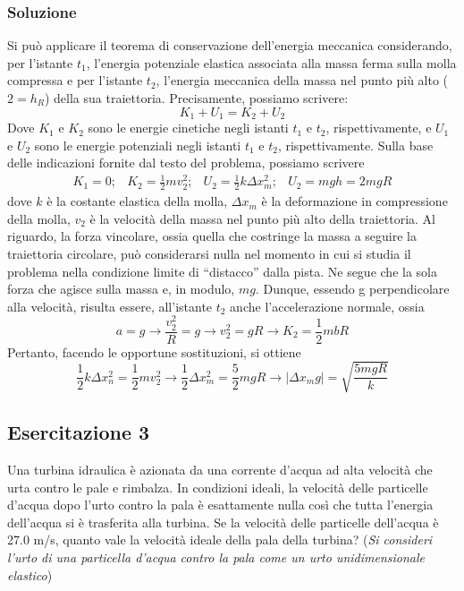 \subsubsection{Soluzione}
Si può applicare il teorema di conservazione dell’energia meccanica considerando, per l’istante $t_1$, l’energia potenziale elastica associata alla massa ferma sulla molla compressa e per l’istante  $t_2$, l’energia  meccanica  della  massa  nel  punto  più  alto  ($2=h_R$)  della  sua  traiettoria.  Precisamente, possiamo scrivere:
\begin{equation*}
	K_1+U_1=K_2+U_2
\end{equation*}
Dove  $K_1$  e  $K_2$  sono le energie cinetiche negli istanti  $t_1$  e  $t_2$, rispettivamente, e  $U_1$  e  $U_2$  sono le energie potenziali negli istanti $t_1$ e $t_2$, rispettivamente. Sulla base delle indicazioni fornite dal testo del problema, possiamo scrivere
\begin{equation*}
	\begin{matrix}
		K_1=0;&K_2=\frac{1}{2}mv_2^2;&U_2=\frac{1}{2}k\Delta x_m^2;&U_2=mgh=2mgR
	\end{matrix}
\end{equation*}
dove $k$ è la costante elastica della molla, $\Delta x_m$ è la deformazione in compressione della molla, $v_2$ è la velocità della massa nel punto più alto della traiettoria. Al riguardo, la forza vincolare, ossia quella che costringe la massa a seguire la traiettoria circolare, può considerarsi nulla nel momento in cui si studia il problema nella condizione limite di ``distacco'' dalla pista. Ne segue che la sola forza che agisce sulla massa e, in modulo, $mg$. Dunque, essendo g perpendicolare alla velocità, risulta essere, all’istante $t_2$ anche l’accelerazione normale, ossia
\begin{equation*}
	a=g \to \frac{v_2^2}{R}=g\to v_2^2=gR\to K_2=\frac{1}{2}mbR
\end{equation*}
Pertanto, facendo le opportune sostituzioni, si ottiene
\begin{equation*}
	\frac{1}{2}k\Delta x_n^2=\frac{1}{2}mv_2^2\to \frac{1}{2}\Delta x_m^2=\frac{5}{2}mgR\to|\Delta x_mg|=\sqrt{\frac{5mgR}{k}}
\end{equation*}
\subsection{Esercitazione 3}
Una turbina idraulica è azionata da una corrente d'acqua ad alta velocità che urta contro le pale e rimbalza.   In   condizioni   ideali,   la   velocità   delle   particelle   d'acqua   dopo   l'urto   contro   la   pala   è esattamente nulla così che tutta l'energia dell'acqua si è trasferita alla turbina. Se la velocità delle particelle dell'acqua è 27.0 m/s, quanto vale la velocità ideale della pala della turbina? (\textit{Si consideri l'urto di una particella d'acqua contro la pala come un urto unidimensionale elastico})
